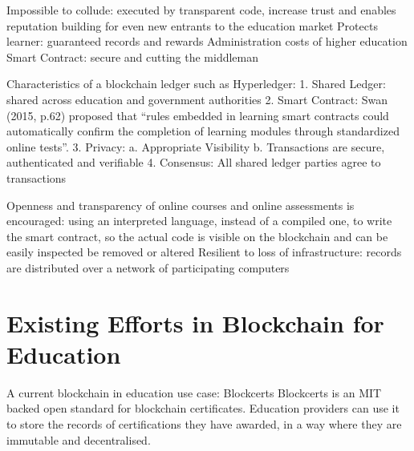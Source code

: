 Impossible to collude: executed by transparent code, increase trust and enables reputation building for even new entrants to 
the education market
Protects learner: guaranteed records and rewards
Administration costs of higher education
Smart Contract: secure and cutting the middleman

Characteristics of a blockchain ledger such as Hyperledger:
1. Shared Ledger: 
shared across education and government authorities
2. Smart Contract: 
Swan (2015, p.62) proposed that “rules embedded in learning smart contracts could automatically confirm the completion of learning modules 
through standardized online tests”.
3. Privacy: 
a. Appropriate Visibility
b. Transactions are secure, authenticated and verifiable
4. Consensus: All shared ledger parties agree to transactions

Openness and transparency of online courses and online assessments is encouraged: using an interpreted language, instead of a compiled 
one, to write the smart contract, so the actual code is visible on the blockchain and can be easily inspected
be removed or altered
Resilient to loss of infrastructure: records are distributed over a network of participating computers

\section{Existing Efforts in Blockchain for Education}


A current blockchain in education use case: Blockcerts
Blockcerts is an MIT backed open standard for blockchain certificates. Education providers can use it to store the records of 
certifications they have awarded, in a way where they are immutable and decentralised. 

